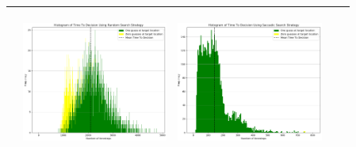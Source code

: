 \begin{landscape}
\begin{table}[h!]
\begin{tabular}{ | m{8mm} | c | c | c | c |}
\begin{minipage}[c][48mm][c]{48mm}
    \end{minipage}
    &
    \begin{minipage}[c][48mm][c]{48mm}
      \includegraphics[width=48mm, height=48mm]{Chapters/MultiAgentTargetDetection/Figs/Histograms/MiscalibratedSensor/4-4/4-4RandomHistogram.png}
    \end{minipage}
    &
    \begin{minipage}[c][48mm][c]{48mm}
      \includegraphics[width=48mm, height=48mm]{Chapters/MultiAgentTargetDetection/Figs/Histograms/MiscalibratedSensor/4-4/4-4SaccadicHistogram.png}
    \end{minipage}
    \\
    \hline


\end{tabular}
\end{table}
\end{landscape}
